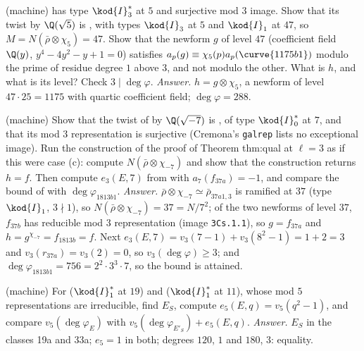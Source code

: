 \begin{exercise}\label{exer:modgalrep:1175b1}
(machine)  has type $\kod{I}_3^*$ at $5$ and surjective mod $3$ image. Show that its twist by $\Q(\sqrt5)$ is , with types $\kod{I}_3$ at $5$ and $\kod{I}_1$ at $47$, so
$M=N(\bar\rho\otimes\chi_5)=47$. Show that the newform $g$ of level $47$ (coefficient field $\Q(y)$, $y^4-4y^2-y+1=0$) satisfies $a_p(g)\equiv\chi_5(p)a_p(\curve{1175b1})$ modulo the prime of
residue degree $1$ above $3$, and not modulo the other. What is $h$, and what is its level? Check $3\mid\deg\varphi$. \emph{Answer.} $h=g\otimes\chi_5$, a newform of level $47\cdot25=1175$ with
quartic coefficient field; $\deg\varphi=288$.
\end{exercise}

\begin{exercise}\label{exer:modgalrep:I0star}
(machine) Show that the twist of  by $\Q(\sqrt{-7})$ is , of type $\kod{I}_0^*$ at $7$, and that its mod $3$ representation is surjective (Cremona's
\texttt{galrep} lists no exceptional image). Run the construction of the proof of Theorem thm:qual at $\ell=3$ as if this were case (c): compute $N(\bar\rho\otimes\chi_{-7})$ and
show that the construction returns $h=f$. Then compute $e_3(E,7)$ from  with $a_7(f_{37a})=-1$, and compare the bound of
 with $\deg\varphi_{1813b1}$. \emph{Answer.} $\bar\rho\otimes\chi_{-7}\simeq\bar\rho_{37a1,3}$ is ramified at $37$ (type $\kod{I}_1$, $3\nmid1$), so $N(\bar\rho\otimes\chi_{-7})=37=N/7^2$; of
the two newforms of level $37$, $f_{37b}$ has reducible mod $3$ representation (image \texttt{3Cs.1.1}), so $g=f_{37a}$ and $h=g^{\chi_{-7}}=f_{1813b}=f$. Next
$e_3(E,7)=v_3(7-1)+v_3(8^2-1)=1+2=3$ and $v_3(r_{37a})=v_3(2)=0$, so $v_3(\deg\varphi)\ge3$; and $\deg\varphi_{1813b1}=756=2^2\cdot3^3\cdot7$, so the bound is attained.
\end{exercise}

\begin{exercise}[Theorem thm:quant at $\ell=5$]\label{exer:modgalrep:quant-5}
(machine) For  ($\kod{I}_1^*$ at $19$) and  ($\kod{I}_1^*$ at $11$), whose mod $5$ representations are irreducible, find $E_S$, compute $e_5(E,q)=v_5(q^2-1)$, and compare
$v_5(\deg\varphi_E)$ with $v_5(\deg\varphi_{E'_S})+e_5(E,q)$. \emph{Answer.} $E_S$ in the classes 19a and 33a; $e_5=1$ in both; degrees $120$, $1$ and $180$, $3$: equality.
\end{exercise}


